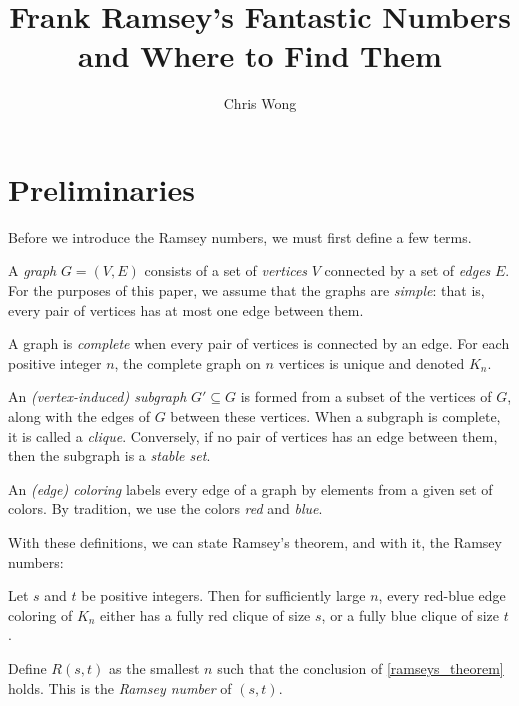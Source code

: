 \documentclass{article}
\begin{document}
\author{Chris Wong}
\title{Frank Ramsey's Fantastic Numbers and Where to Find Them}
\maketitle


\section{Preliminaries}

Before we introduce the Ramsey numbers, we must first define a few terms.

A \textit{graph} $G = (V, E)$ consists of a set of \textit{vertices} $V$ connected by a set of \textit{edges} $E$. For the purposes of this paper, we assume that the graphs are \textit{simple}: that is, every pair of vertices has at most one edge between them.

A graph is \textit{complete} when every pair of vertices is connected by an edge. For each positive integer $n$, the complete graph on $n$ vertices is unique and denoted $K_n$.

An \textit{(vertex-induced) subgraph} $G' \subseteq G$ is formed from a subset of the vertices of $G$, along with the edges of $G$ between these vertices. When a subgraph is complete, it is called a \textit{clique}. Conversely, if no pair of vertices has an edge between them, then the subgraph is a \textit{stable set}.

An \textit{(edge) coloring} labels every edge of a graph by elements from a given set of colors. By tradition, we use the colors \textit{red} and \textit{blue}.

With these definitions, we can state Ramsey's theorem, and with it, the Ramsey numbers:

\begin{Theorem} \label{ramseys_theorem}
    Let $s$ and $t$ be positive integers. Then for sufficiently large $n$, every red-blue edge coloring of $K_n$ either has a fully red clique of size $s$, or a fully blue clique of size $t$.
\end{Theorem}

\begin{Definition}
    Define $R(s,t)$ as the smallest $n$ such that the conclusion of \cref{ramseys_theorem} holds. This is the \textit{Ramsey number} of $(s,t)$.
\end{Definition}
\end{document}
